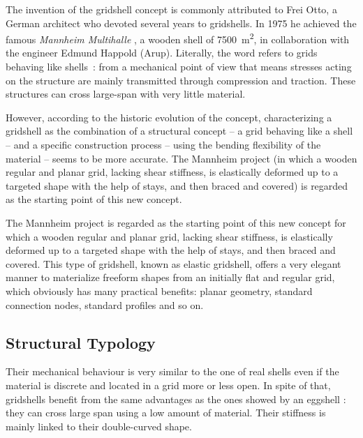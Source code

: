 The invention of the gridshell concept is commonly attributed to Frei Otto, a German architect who devoted several years to gridshells. In 1975 he achieved the famous \emph{Mannheim Multihalle} \cite{Happold1975}, a wooden shell of 7500~m\textsuperscript{2}, in collaboration with the engineer Edmund Happold (Arup).
Literally, the word  refers to grids behaving like shells~: from a mechanical point of view that means stresses acting on the structure are mainly transmitted through compression and traction. These structures can cross large-span with very little material.

However, according to the historic evolution of the concept, characterizing a gridshell as the combination of a structural concept -- a grid behaving like a shell -- and a specific construction process -- using the bending flexibility of the material -- seems to be more accurate. The Mannheim project (in which a wooden regular and planar grid, lacking shear stiffness, is elastically deformed up to a targeted shape with the help of stays, and then braced and covered) is regarded as the starting point of this new concept.

The Mannheim project is regarded as the starting point of this new concept for which a wooden regular and planar grid, lacking shear stiffness, is elastically deformed up to a targeted shape with the help of stays, and then braced and covered.
This type of gridshell, known as elastic gridshell, offers a very elegant manner to materialize freeform shapes from an initially flat and regular grid, which obviously has many practical benefits: planar geometry, standard connection nodes, standard profiles and so on.


\subsection{Structural Typology}
Their mechanical behaviour is very similar to the one of real shells even if the material is discrete and located in a grid more or less open. In spite of that, gridshells benefit from the same advantages as the ones showed by an eggshell : they can cross large span using a low amount of material. Their stiffness is mainly linked to their double-curved shape.


